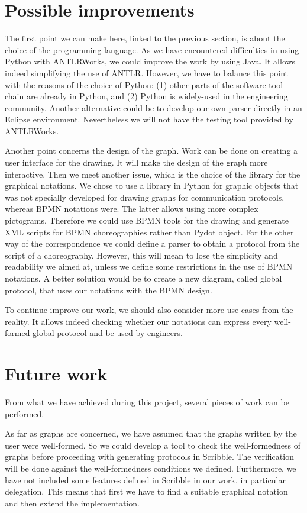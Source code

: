 \documentclass[a4paper,11pt,twoside]{report}
\begin{document}
\section*{Possible improvements}
The first point we can make here, linked to the previous section, is about the choice of the programming language. As we have encountered difficulties in using Python with ANTLRWorks, we could improve the work by using Java. It allows indeed simplifying the use of ANTLR. However, we have to balance this point with the reasons of the choice of Python: (1) other parts of the software tool chain are already in Python, and (2) Python is widely-used in the engineering community. Another alternative could be to develop our own parser directly in an Eclipse environment. Nevertheless we will not have the testing tool provided by ANTLRWorks.

Another point concerns the design of the graph. Work can be done on creating a user interface for the drawing. It will make the design of the graph more interactive. Then we meet another issue, which is the choice of the library for the graphical notations. We chose to use a library in Python for graphic objects that was not specially developed for drawing graphs for communication protocols, whereas BPMN notations were. The latter allows using more complex pictograms. Therefore we could use BPMN tools for the drawing and generate XML scripts for BPMN choreographies rather than Pydot object. For the other way of the correspondence we could define a parser to obtain a protocol from the script of a choreography. However, this will mean to lose the simplicity and readability we aimed at, unless we define some restrictions in the use of BPMN notations. A better solution would be to create a new diagram, called global protocol, that uses our notations with the BPMN design.

To continue improve our work, we should also consider more use cases from the reality. It allows indeed checking whether our notations can express every well-formed global protocol and be used by engineers.


\section*{Future work}
From what we have achieved during this project, several pieces of work can be performed.

As far as graphs are concerned, we have assumed that the graphs written by the user were well-formed. So we could develop a tool to check the well-formedness of graphs before proceeding with generating protocols in Scribble. The verification will be done against the well-formedness conditions we defined. Furthermore, we have not included some features defined in Scribble in our work, in particular delegation. This means that first we have to find a suitable graphical notation and then extend the implementation.
\end{document}
